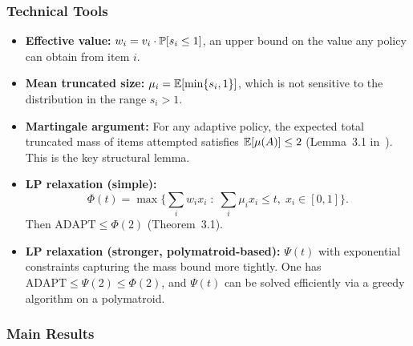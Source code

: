 \subsubsection{Technical Tools}

\begin{itemize}
    \item \textbf{Effective value:} $w_i = v_i \cdot \P[s_i \le 1]$, an upper bound on the value any policy can obtain from item $i$.
    \item \textbf{Mean truncated size:} $\mu_i = \E[\min\{s_i, 1\}]$, which is not sensitive to the distribution in the range $s_i > 1$.
    \item \textbf{Martingale argument:} For any adaptive policy, the expected total truncated mass of items attempted satisfies $\E[\mu(A)] \le 2$ (Lemma~3.1 in~\cite{DeanGoemansVondrak2008}). This is the key structural lemma.
    \item \textbf{LP relaxation (simple):}
    \[
        \Phi(t) = \max\Big\{\sum_i w_i x_i \;:\; \sum_i \mu_i x_i \le t,\; x_i \in [0,1]\Big\}.
    \]
    Then $\mathrm{ADAPT} \le \Phi(2)$ (Theorem~3.1).
    \item \textbf{LP relaxation (stronger, polymatroid-based):} $\Psi(t)$ with exponential constraints capturing the mass bound more tightly. One has $\mathrm{ADAPT} \le \Psi(2) \le \Phi(2)$, and $\Psi(t)$ can be solved efficiently via a greedy algorithm on a polymatroid.
\end{itemize}

\subsubsection{Main Results}

